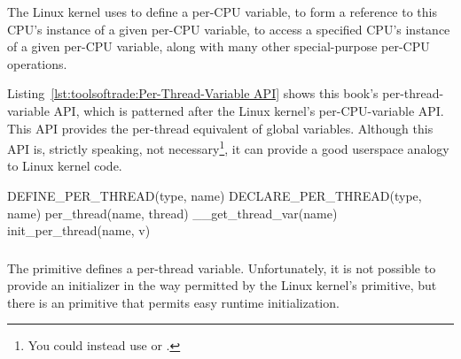 The Linux kernel uses  to define a per-CPU variable,
 to form a reference to this CPU's instance of a
given per-CPU variable,  to access a specified CPU's
instance of a given per-CPU variable, along with many other special-purpose
per-CPU operations.

Listing~\ref{lst:toolsoftrade:Per-Thread-Variable API}
shows this book's per-thread-variable API, which is patterned
after the Linux kernel's per-CPU-variable API.
This API provides the per-thread equivalent of global variables.
Although this API is, strictly speaking, not necessary\footnote{
	You could instead use  or .},
it can provide a good userspace analogy to Linux kernel code.

\begin{listing}[tbp]
\begin{VerbatimL}[numbers=none]
DEFINE_PER_THREAD(type, name)
DECLARE_PER_THREAD(type, name)
per_thread(name, thread)
__get_thread_var(name)
init_per_thread(name, v)
\end{VerbatimL}
\caption{Per-Thread-Variable API}
\label{lst:toolsoftrade:Per-Thread-Variable API}
\end{listing}

\QuickQuizEnd

\subsubsection{}

The  primitive defines a per-thread variable.
Unfortunately, it is not possible to provide an initializer in the way
permitted by the Linux kernel's  primitive,
but there is an  primitive that permits easy
runtime initialization.

